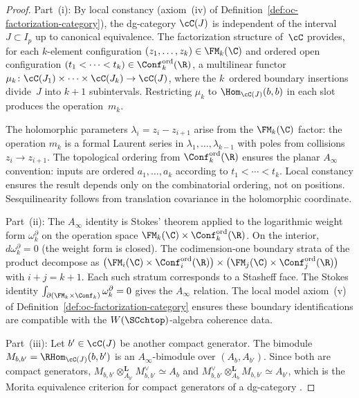 \begin{proof}
Part~(i):
By local constancy (axiom~(iv) of
Definition~\ref{def:oc-factorization-category}), the dg-category
$\cC(J)$ is independent of the interval $J \subset I_p$ up to
canonical equivalence. The factorization structure of~$\cC$
provides, for each $k$-element configuration
$(z_1, \ldots, z_k) \in \FM_k(\C)$ and ordered open
configuration $(t_1 < \cdots < t_k) \in \Conf_k^{\mathrm{ord}}(\R)$,
a multilinear functor
$\mu_k \colon \cC(J_1) \times \cdots \times \cC(J_k) \to \cC(J)$,
where the $k$~ordered boundary insertions divide~$J$ into $k+1$
subintervals. Restricting $\mu_k$ to
$\Hom_{\cC(J)}(b,b)$ in each slot produces the operation~$m_k$.

The holomorphic parameters $\lambda_i = z_i - z_{i+1}$ arise
from the $\FM_k(\C)$ factor: the operation $m_k$ is a formal
Laurent series in $\lambda_1, \ldots, \lambda_{k-1}$ with
poles from collisions $z_i \to z_{i+1}$.
The topological ordering from $\Conf_k^{\mathrm{ord}}(\R)$
ensures the planar $A_\infty$ convention: inputs are ordered
$a_1, \ldots, a_k$ according to $t_1 < \cdots < t_k$.
Local constancy ensures the result depends only on the
combinatorial ordering, not on positions.
Sesquilinearity follows from translation covariance in the
holomorphic coordinate.

Part~(ii):
The $A_\infty$ identity is Stokes' theorem applied to the
logarithmic weight form $\omega_k^\partial$ on the operation
space $\FM_k(\C) \times \Conf_k^{\mathrm{ord}}(\R)$.
On the interior, $d\omega_k^\partial = 0$ (the weight form is
closed). The codimension-one boundary strata of the product
decompose as
$\bigl(\FM_i(\C) \times \Conf_i^{\mathrm{ord}}(\R)\bigr)
\times
\bigl(\FM_j(\C) \times \Conf_j^{\mathrm{ord}}(\R)\bigr)$
with $i + j = k + 1$. Each such stratum corresponds to a
Stasheff face. The Stokes identity
$\int_{\partial(\FM_k \times \Conf_k)} \omega_k^\partial = 0$
gives the $A_\infty$ relation. The local model axiom~(v) of
Definition~\ref{def:oc-factorization-category} ensures these
boundary identifications are compatible with the
$W(\SCchtop)$-algebra coherence data.

Part~(iii):
Let $b' \in \cC(J)$ be another compact generator. The bimodule
$M_{b,b'} = \RHom_{\cC(J)}(b, b')$ is an $A_\infty$-bimodule
over $(A_b, A_{b'})$. Since both are compact generators,
$M_{b,b'} \otimes^{\mathbf{L}}_{A_{b'}} M_{b,b'}^\vee
\simeq A_b$ and
$M_{b,b'}^\vee \otimes^{\mathbf{L}}_{A_b} M_{b,b'}
\simeq A_{b'}$, which is the Morita equivalence criterion for
compact generators of a dg-category \cite{Kel06,HA}.
\end{proof}

